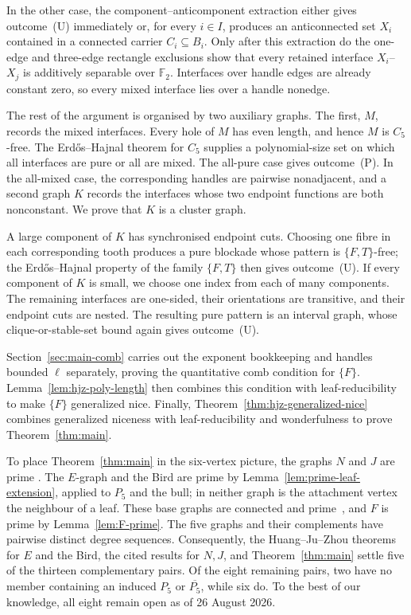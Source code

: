 \documentclass[11pt]{article}
\numberwithin{equation}{section}
\theoremstyle{plain}
\theoremstyle{definition}
\begin{document}
In the other case, the component--anticomponent extraction either gives
outcome~(U) immediately or, for every $i\in I$, produces an
anticonnected set $X_i$ contained in a connected carrier
$C_i\subseteq B_i$.  Only after this extraction do the one-edge and
three-edge rectangle exclusions show that every retained interface
$X_i$--$X_j$ is additively separable over $\mathbb F_2$.  Interfaces
over handle edges are already constant zero, so every mixed interface
lies over a handle nonedge.

The rest of the argument is organised by two auxiliary graphs.  The
first, $M$, records the mixed interfaces.  Every hole of $M$ has even
length, and hence $M$ is $C_5$-free.  The Erd\H{o}s--Hajnal theorem for
$C_5$ supplies a polynomial-size set on which all interfaces are pure
or all are mixed.  The all-pure case gives outcome~(P).  In
the all-mixed case, the corresponding handles are pairwise nonadjacent,
and a second graph $K$ records the interfaces whose two endpoint
functions are both nonconstant.  We prove that $K$ is a cluster graph.

A large component of $K$ has synchronised endpoint cuts.  Choosing one
fibre in each corresponding tooth produces a pure blockade whose
pattern is $\{F,T\}$-free; the Erd\H{o}s--Hajnal property of the family
$\{F,T\}$ then gives outcome~(U).  If every component of $K$
is small, we choose one index from each of many components.  The
remaining interfaces are one-sided, their orientations are transitive,
and their endpoint cuts are nested.  The resulting pure pattern is an
interval graph, whose clique-or-stable-set bound again gives
outcome~(U).

Section~\ref{sec:main-comb} carries out the exponent bookkeeping and
handles bounded $\ell$ separately, proving the quantitative comb
condition for $\{F\}$.  Lemma~\ref{lem:hjz-poly-length} then combines
this condition with leaf-reducibility to make $\{F\}$ generalized nice.
Finally, Theorem~\ref{thm:hjz-generalized-nice} combines generalized
niceness with leaf-reducibility and wonderfulness to prove
Theorem~\ref{thm:main}.

To place Theorem~\ref{thm:main} in the six-vertex picture, the graphs
$N$ and $J$ are prime
\cite[Figure~1 and p.~22]{NguyenScottSeymourDensityIV}.
The $E$-graph and the Bird are prime by
Lemma~\ref{lem:prime-leaf-extension}, applied to $P_5$ and the bull; in
neither graph is the attachment vertex the neighbour of a leaf.  These
base graphs are connected and prime~\cite[p.~3]{HuangJuZhou2026}, and
$F$ is prime by Lemma~\ref{lem:F-prime}.  The five graphs and their
complements have pairwise distinct degree sequences.  Consequently, the
Huang--Ju--Zhou theorems for $E$ and the Bird, the cited results for
$N,J$, and Theorem~\ref{thm:main} settle five of the thirteen
complementary pairs.
Of the eight remaining pairs, two have no member containing an induced
$P_5$ or $\overline{P_5}$, while six do.  To the best of our knowledge,
all eight remain open as of 26 August 2026.
\end{document}
